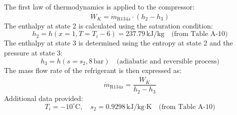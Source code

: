 The first law of thermodynamics is applied to the compressor:  
\[
\dot{W}_K = \dot{m}_{\text{R134a}} \cdot (h_2 - h_3)
\]  
The enthalpy at state 2 is calculated using the saturation condition:  
\[
h_2 = h(x=1, T=T_i - 6) = 237.79 \, \text{kJ/kg} \quad \text{(from Table A-10)}
\]  
The enthalpy at state 3 is determined using the entropy at state 2 and the pressure at state 3:  
\[
h_3 = h(s=s_2, 8 \, \text{bar}) \quad \text{(adiabatic and reversible process)}
\]  
The mass flow rate of the refrigerant is then expressed as:  
\[
\dot{m}_{\text{R134a}} = \frac{\dot{W}_K}{h_2 - h_3}
\]  
Additional data provided:  
\[
T_i = -10^\circ\text{C}, \quad s_2 = 0.9298 \, \text{kJ/kg·K} \quad \text{(from Table A-10)}
\]